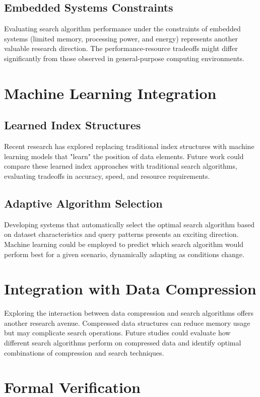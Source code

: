 \subsection{Embedded Systems Constraints}
Evaluating search algorithm performance under the constraints of embedded systems (limited memory, processing power, and energy) represents another valuable research direction. The performance-resource tradeoffs might differ significantly from those observed in general-purpose computing environments.

\section{Machine Learning Integration}

\subsection{Learned Index Structures}
Recent research has explored replacing traditional index structures with machine learning models that "learn" the position of data elements. Future work could compare these learned index approaches with traditional search algorithms, evaluating tradeoffs in accuracy, speed, and resource requirements.

\subsection{Adaptive Algorithm Selection}
Developing systems that automatically select the optimal search algorithm based on dataset characteristics and query patterns presents an exciting direction. Machine learning could be employed to predict which search algorithm would perform best for a given scenario, dynamically adapting as conditions change.

\section{Integration with Data Compression}

Exploring the interaction between data compression and search algorithms offers another research avenue. Compressed data structures can reduce memory usage but may complicate search operations. Future studies could evaluate how different search algorithms perform on compressed data and identify optimal combinations of compression and search techniques.

\section{Formal Verification}

